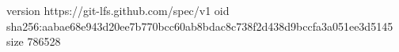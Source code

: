 version https://git-lfs.github.com/spec/v1
oid sha256:aabae68e943d20ee7b770bcc60ab8bdac8c738f2d438d9bccfa3a051ee3d5145
size 786528
